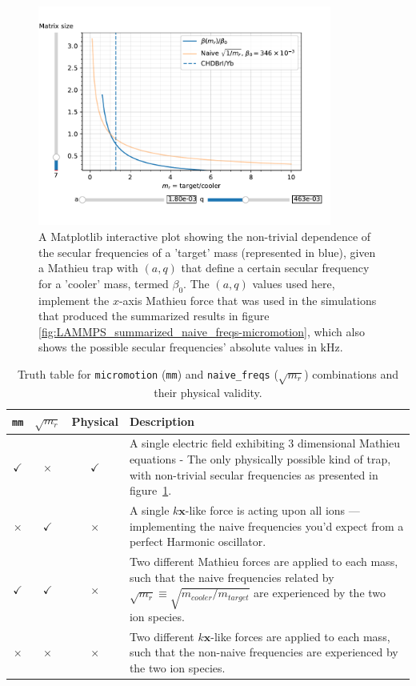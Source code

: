 \begin{figure}
	\begin{center}
		\includegraphics[width=0.86\textwidth]{graphics/mathieu-mass-dep.pdf}
	\end{center}
	\caption{A Matplotlib interactive plot showing the non-trivial dependence of the secular frequencies of a 'target' mass (represented in blue), given a Mathieu trap with $(a,q)$ that define a certain secular frequency for a 'cooler' mass, termed $\beta_0$. The $(a,q)$ values used here, implement the $x$-axis Mathieu force that was used in the simulations that produced the summarized results in figure \ref{fig:LAMMPS_summarized_naive_freqs-micromotion}, which also shows the possible secular frequencies' absolute values in $\mathrm{kHz}$.}
	\label{fig:mathieu-mass-dep}
\end{figure}

\begin{table}[h]
\centering
\begin{tabularx}{\textwidth}{cccX}
\toprule
\texttt{mm} & $\sqrt{m_r}$ & \textbf{Physical} & \textbf{Description} \\
\midrule
$\checkmark$ & $\times$ & $\checkmark$ & A single electric field exhibiting 3 dimensional Mathieu equations - The only physically possible kind of trap, with non-trivial secular frequencies as presented in figure~\ref{fig:mathieu-mass-dep}. \\
\midrule
$\times$ & $\checkmark$ & $\times$ & A single \(k \mathbf{x}\)-like force is acting upon all ions — implementing the naive frequencies you'd expect from a perfect Harmonic oscillator. \\
\midrule
$\checkmark$ & $\checkmark$ & $\times$ & Two different Mathieu forces are applied to each mass, such that the naive frequencies related by $\sqrt{m_r} \equiv \sqrt{m_{cooler}/m_{target}}$ are experienced by the two ion species. \\
\midrule
$\times$ & $\times$ & $\times$ & Two different \(k \mathbf{x}\)-like forces are applied to each mass, such that the non-naive frequencies are experienced by the two ion species. \\
\bottomrule
\end{tabularx}
\caption{Truth table for \texttt{micromotion} (\texttt{mm}) and \texttt{naive\_freqs} ($\sqrt{m_r}$) combinations and their physical validity.}
\label{tbl:naive_freqs-micromotion}
\end{table}

